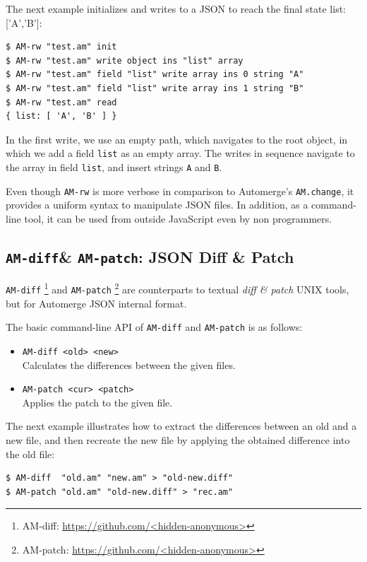 \documentclass[12pt]{article}
\newcommand{\code}[1]  {\texttt{\footnotesize{#1}}}
\newcommand{\amrw}       {\texttt{AM-rw}\xspace}
\newcommand{\amdiff}     {\texttt{AM-diff}\xspace}
\newcommand{\ampatch}    {\texttt{AM-patch}\xspace}
\begin{document}
The next example initializes and writes to a JSON to reach the final state
{list: ['A','B']}:

\begin{verbatim}
$ AM-rw "test.am" init
$ AM-rw "test.am" write object ins "list" array
$ AM-rw "test.am" field "list" write array ins 0 string "A"
$ AM-rw "test.am" field "list" write array ins 1 string "B"
$ AM-rw "test.am" read
{ list: [ 'A', 'B' ] }
\end{verbatim}

In the first write, we use an empty path, which navigates to the root object,
in which we add a field \code{list} as an empty array.
The writes in sequence navigate to the array in field \code{list}, and insert
strings \code{A} and \code{B}.

Even though \amrw is more verbose in comparison to Automerge's
\code{AM.change}, it provides a uniform syntax to manipulate JSON files.
In addition, as a command-line tool, it can be used from outside JavaScript
even by non programmers.

\subsection{\amdiff \& \ampatch: JSON Diff \& Patch}

\amdiff%
    \footnote{AM-diff: \url{https://github.com/<hidden-anonymous>}}
and \ampatch%
    \footnote{AM-patch: \url{https://github.com/<hidden-anonymous>}}
are counterparts to textual \emph{diff \& patch} UNIX tools, but for
Automerge JSON internal format.

The basic command-line API of \amdiff and \ampatch is as follows:

\begin{itemize}
\item \code{AM-diff <old> <new>} \\
    Calculates the differences between the given files.
\item \code{AM-patch <cur> <patch>} \\
    Applies the patch to the given file.
\end{itemize}

The next example illustrates how to extract the differences between an old and
a new file, and then recreate the new file by applying the obtained difference
into the old file:

\begin{verbatim}
$ AM-diff  "old.am" "new.am" > "old-new.diff"
$ AM-patch "old.am" "old-new.diff" > "rec.am"
\end{verbatim}
\end{document}
